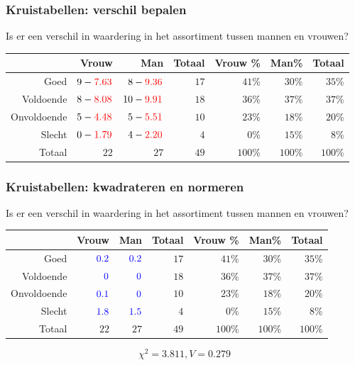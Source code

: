 \documentclass[aspectratio=169]{beamer}
\begin{document}
\begin{frame}
  \frametitle{Kruistabellen: verschil bepalen}
  Is er een verschil in waardering in het assortiment tussen mannen en vrouwen?
  \begin{adjustwidth}{-1.5em}{-1.5em}
    \begin{table}[h] \centering
      \begin{tabular}{@{}rrrrrrr@{}} \toprule
        & Vrouw & Man & Totaal & Vrouw \% & Man\%   & Totaal  \\ \midrule
        Goed        & $9 -\textcolor{red}{7.63}$     & $8 - \textcolor{red}{9.36}$   & $17$     & $41$\%  & $30$\% & $35$\% \\
        Voldoende   & $8 - \textcolor{red}{8.08}$   & $10 - \textcolor{red}{9.91}$  & $18$     & $36$\%  & $37$\%    & $37$\% \\
        Onvoldoende & $5 - \textcolor{red}{4.48}$    & $5 - \textcolor{red}{5.51}$  & $10$     & $23$\%  & $18$\% & $20$\% \\
        Slecht      & $0 - \textcolor{red}{1.79}$    & $4 - \textcolor{red}{2.20}$  & $4$      & $0$\%      & $15$\% & $8$\%  \\
        Totaal      & $22$    & $27$  & $49$     & $100$\%    & $100$\%   & $100$\%   \\
        \bottomrule
      \end{tabular}
    \end{table}
  \end{adjustwidth}
\end{frame}

\begin{frame}
  \frametitle{Kruistabellen: kwadrateren en normeren}
  Is er een verschil in waardering in het assortiment tussen mannen en vrouwen?
  \begin{table}[h] \centering
    \begin{tabular}{@{}rrrrrrr@{}} \toprule
                  & Vrouw                   & Man                     & Totaal & Vrouw \% & Man\%   & Totaal  \\
      \midrule
      Goed        & $\textcolor{blue}{0.2}$ & $\textcolor{blue}{0.2}$ & $17$   & $41$\%   & $30$\%  & $35$\% \\
      Voldoende   & $\textcolor{blue}{0}$   & $\textcolor{blue}{0}$   & $18$   & $36$\%   & $37$\%  & $37$\% \\
      Onvoldoende & $\textcolor{blue}{0.1}$ & $\textcolor{blue}{0}$   & $10$   & $23$\%   & $18$\%  & $20$\% \\
      Slecht      & $\textcolor{blue}{1.8}$ & $\textcolor{blue}{1.5}$ & $4$    & $0$\%    & $15$\%  & $8$\%  \\
      Totaal      & $22$                    & $27$                    & $49$   & $100$\%  & $100$\% & $100$\%   \\
      \bottomrule
    \end{tabular}
  \end{table}
  \[ \chi^{2} = 3.811, V= 0.279 \]
\end{frame}
\end{document}
